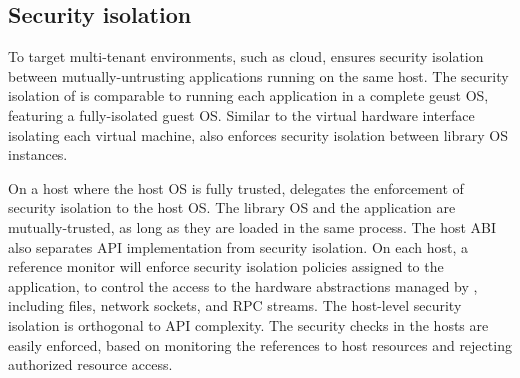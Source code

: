 \subsection{Security isolation}
\label{sec:overview:host:security}


To target multi-tenant environments, such as cloud,
\graphene{} ensures security isolation between mutually-untrusting applications running on the same host.
The security isolation of \graphene{} is comparable to running each application
in a complete geust OS, featuring a fully-isolated guest OS.
Similar to the virtual hardware interface isolating each virtual machine,
\thehostabi{} also enforces security isolation between library OS instances.


On a host where the host OS is fully trusted,
\graphene{} delegates the enforcement of security isolation to the host OS.
The library OS and the application are mutually-trusted, as long as they are loaded in the same process.
The host ABI also separates API implementation
from security isolation.
On each host, a reference monitor will enforce security isolation policies assigned to the application, to control the access to the hardware abstractions managed by \thehostabi{}, including files, network sockets, and RPC streams.
The host-level security isolation is orthogonal to API complexity.
The security checks in the hosts are easily enforced,
based on monitoring the references to host resources and rejecting authorized resource access.








